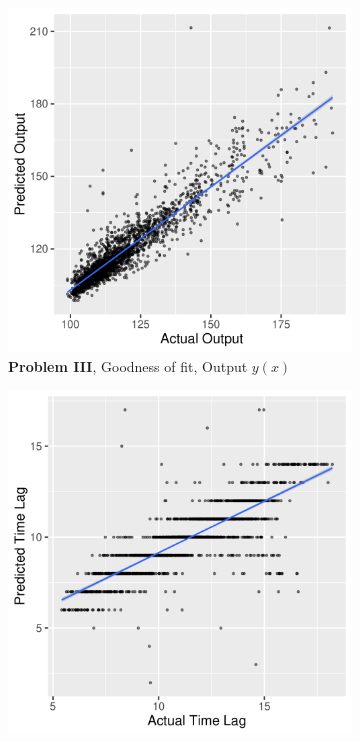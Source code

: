 \documentclass[envcountsect,runningheads]{llncs}
\theoremstyle{etoile}
\begin{document}
\begin{figure}
  \centering

  \begin{subfigure}[b]{0.4\textwidth}
    \centering
    \includegraphics[width=\textwidth]{figures/exp3_scatter_v_test}
    \caption{ \textbf{Problem III}, Goodness of fit, Output $y(x)$}
    \label{fig:problem3_fitv}
  \end{subfigure}
  \hfill
  \begin{subfigure}[b]{0.4\textwidth}
    \centering
    \includegraphics[width=\textwidth]{figures/exp3_scatter_t_test}

\end{subfigure}
\end{figure}
\end{document}

